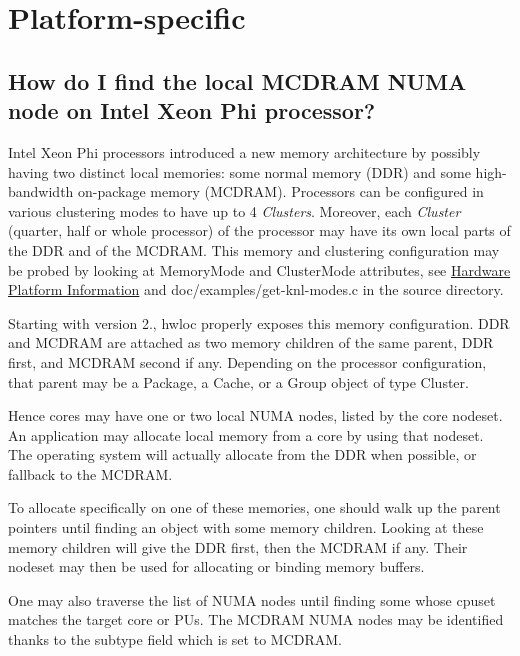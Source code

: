  \hypertarget{a00394_faq4}{}\section{Platform-\/specific}\label{a00394_faq4}
\hypertarget{a00394_faq_knl_numa}{}\subsection{How do I find the local M\+C\+D\+R\+A\+M N\+U\+M\+A node on Intel Xeon Phi processor?}\label{a00394_faq_knl_numa}
Intel Xeon Phi processors introduced a new memory architecture by possibly having two distinct local memories\+: some normal memory (D\+DR) and some high-\/bandwidth on-\/package memory (M\+C\+D\+R\+AM). Processors can be configured in various clustering modes to have up to 4 {\itshape Clusters}. Moreover, each {\itshape Cluster} (quarter, half or whole processor) of the processor may have its own local parts of the D\+DR and of the M\+C\+D\+R\+AM. This memory and clustering configuration may be probed by looking at Memory\+Mode and Cluster\+Mode attributes, see \hyperlink{a00386_attributes_info_platform}{Hardware Platform Information} and doc/examples/get-\/knl-\/modes.\+c in the source directory.

Starting with version 2., hwloc properly exposes this memory configuration. D\+DR and M\+C\+D\+R\+AM are attached as two memory children of the same parent, D\+DR first, and M\+C\+D\+R\+AM second if any. Depending on the processor configuration, that parent may be a Package, a Cache, or a Group object of type {\ttfamily Cluster}.

Hence cores may have one or two local N\+U\+MA nodes, listed by the core nodeset. An application may allocate local memory from a core by using that nodeset. The operating system will actually allocate from the D\+DR when possible, or fallback to the M\+C\+D\+R\+AM.

To allocate specifically on one of these memories, one should walk up the parent pointers until finding an object with some memory children. Looking at these memory children will give the D\+DR first, then the M\+C\+D\+R\+AM if any. Their nodeset may then be used for allocating or binding memory buffers.

One may also traverse the list of N\+U\+MA nodes until finding some whose cpuset matches the target core or P\+Us. The M\+C\+D\+R\+AM N\+U\+MA nodes may be identified thanks to the {\ttfamily subtype} field which is set to {\ttfamily M\+C\+D\+R\+AM}.

